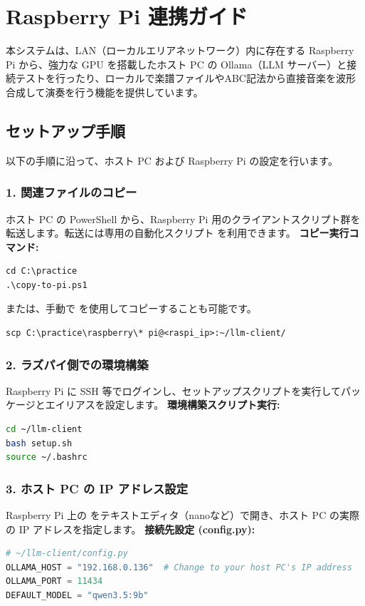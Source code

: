 \section{Raspberry Pi 連携ガイド}

本システムは、LAN（ローカルエリアネットワーク）内に存在する Raspberry Pi から、強力な GPU を搭載したホスト PC の Ollama（LLM サーバー）と接続テストを行ったり、ローカルで楽譜ファイルやABC記法から直接音楽を波形合成して演奏を行う機能を提供しています。

\subsection{セットアップ手順}

以下の手順に沿って、ホスト PC および Raspberry Pi の設定を行います。

\subsubsection{1. 関連ファイルのコピー}
ホスト PC の PowerShell から、Raspberry Pi 用のクライアントスクリプト群を転送します。転送には専用の自動化スクリプト  を利用できます。
\textbf{コピー実行コマンド:}\\
\begin{lstlisting}[style=powershell]
cd C:\practice
.\copy-to-pi.ps1
\end{lstlisting}
または、手動で  を使用してコピーすることも可能です。
\begin{lstlisting}[style=powershell]
scp C:\practice\raspberry\* pi@<raspi_ip>:~/llm-client/
\end{lstlisting}

\subsubsection{2. ラズパイ側での環境構築}
Raspberry Pi に SSH 等でログインし、セットアップスクリプトを実行してパッケージとエイリアスを設定します。
\textbf{環境構築スクリプト実行:}\\
\begin{lstlisting}[language=bash]
cd ~/llm-client
bash setup.sh
source ~/.bashrc
\end{lstlisting}

\subsubsection{3. ホスト PC の IP アドレス設定}
Raspberry Pi 上の  をテキストエディタ（nanoなど）で開き、ホスト PC の実際の IP アドレスを指定します。
\textbf{接続先設定 (config.py):}\\
\begin{lstlisting}[language=python]
# ~/llm-client/config.py
OLLAMA_HOST = "192.168.0.136"  # Change to your host PC's IP address
OLLAMA_PORT = 11434
DEFAULT_MODEL = "qwen3.5:9b"
\end{lstlisting}

